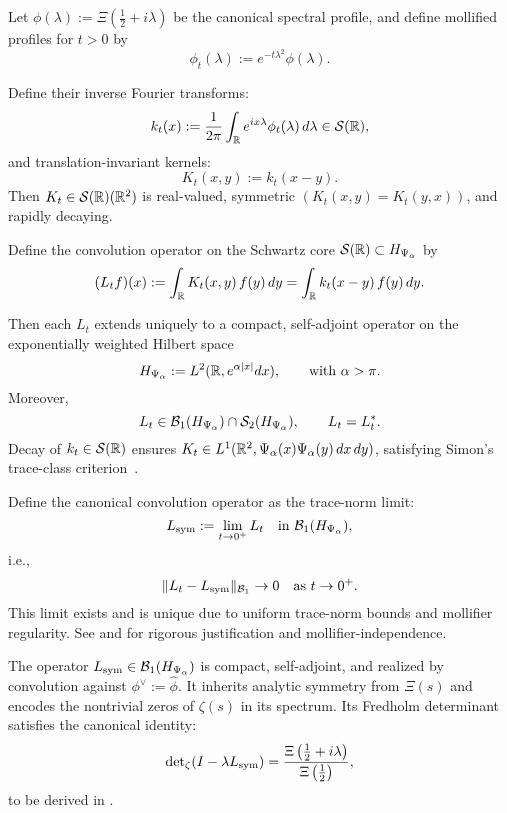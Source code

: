 \begin{definition}
\label{def:convolution_operators_Lt_Lsym}
Let \( \phi(\lambda) := \Xi\left( \tfrac{1}{2} + i\lambda \right) \) be the canonical spectral profile, and define mollified profiles for \( t > 0 \) by
\[
\phi_t(\lambda) := e^{-t\lambda^2} \phi(\lambda).
\]

Define their inverse Fourier transforms:
\[
k_t(x) := \frac{1}{2\pi} \int_{\mathbb{R}} e^{i x \lambda} \phi_t(\lambda)\, d\lambda \in \mathcal{S}(\mathbb{R}),
\]
and translation-invariant kernels:
\[
K_t(x, y) := k_t(x - y).
\]
Then \( K_t \in \mathcal{S}(\mathbb{R})(\mathbb{R}^2) \) is real-valued, symmetric \( (K_t(x,y) = K_t(y,x)) \), and rapidly decaying.

Define the convolution operator on the Schwartz core \( \mathcal{S}(\mathbb{R}) \subset H_{\Psi_\alpha} \) by
\[
(L_t f)(x) := \int_{\mathbb{R}} K_t(x, y)\, f(y)\, dy = \int_{\mathbb{R}} k_t(x - y)\, f(y)\, dy.
\]

Then each \( L_t \) extends uniquely to a compact, self-adjoint operator on the exponentially weighted Hilbert space
\[
H_{\Psi_\alpha} := L^2(\mathbb{R}, e^{\alpha |x|} dx), \qquad \text{with } \alpha > \pi.
\]
Moreover,
\[
L_t \in \mathcal{B}_1(H_{\Psi_\alpha}) \cap \mathcal{S}_2(H_{\Psi_\alpha}), \qquad L_t = L_t^*.
\]
Decay of \( k_t \in \mathcal{S}(\mathbb{R}) \) ensures \( K_t \in L^1(\mathbb{R}^2, \Psi_\alpha(x)\Psi_\alpha(y)\, dx\,dy) \), satisfying Simon’s trace-class criterion~\cite[Ch.~4]{Simon2005TraceIdeals}.

\medskip

Define the canonical convolution operator as the trace-norm limit:
\[
L_{\mathrm{sym}} := \lim_{t \to 0^+} L_t \quad \text{in } \mathcal{B}_1(H_{\Psi_\alpha}),
\]
i.e.,
\[
\| L_t - L_{\mathrm{sym}} \|_{\mathcal{B}_1} \to 0 \quad \text{as } t \to 0^+.
\]
This limit exists and is unique due to uniform trace-norm bounds and mollifier regularity. See  and  for rigorous justification and mollifier-independence.

\medskip

The operator \( L_{\mathrm{sym}} \in \mathcal{B}_1(H_{\Psi_\alpha}) \) is compact, self-adjoint, and realized by convolution against \( \phi^\vee := \widehat{\phi} \). It inherits analytic symmetry from \( \Xi(s) \) and encodes the nontrivial zeros of \( \zeta(s) \) in its spectrum. Its Fredholm determinant satisfies the canonical identity:
\[
\det\nolimits_{\zeta}(I - \lambda L_{\mathrm{sym}}) = \frac{\Xi\left( \tfrac{1}{2} + i\lambda \right)}{\Xi\left( \tfrac{1}{2} \right)},
\]
to be derived in .
\end{definition}
